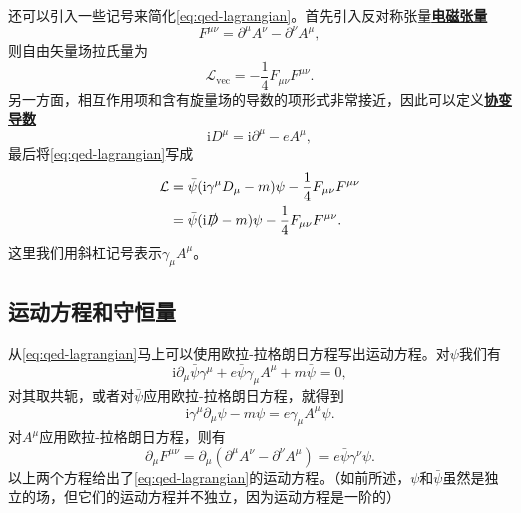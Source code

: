 \documentclass[hyperref, UTF8, a4paper]{ctexart}
\newcommand*{\ii}{\mathrm{i}}
\newcommand{\concept}[1]{\underline{\textbf{#1}}}
\begin{document}
还可以引入一些记号来简化\eqref{eq:qed-lagrangian}。首先引入反对称张量\concept{电磁张量}
\begin{equation}
    F^{\mu \nu} = \partial^\mu A^\nu - \partial^\nu A^\mu,
\end{equation}
则自由矢量场拉氏量为
\[
    \mathcal{L}_\text{vec} = - \frac{1}{4} F_{\mu \nu} F^{\mu \nu}.
\]
另一方面，相互作用项和含有旋量场的导数的项形式非常接近，因此可以定义\concept{协变导数}
\begin{equation}
    \ii D^\mu = \ii \partial^\mu - e A^\mu,
\end{equation}
最后将\eqref{eq:qed-lagrangian}写成
\begin{equation}
    \begin{aligned}
        \mathcal{L} &= \bar{\psi} (\ii \gamma^\mu D_\mu - m) \psi - \frac{1}{4} F_{\mu \nu} F^{\mu \nu} \\
        &= \bar{\psi} (\ii \slashed{D} - m) \psi - \frac{1}{4} F_{\mu \nu} F^{\mu \nu}. 
    \end{aligned}
    \label{eq:short-qed-lagrangian}
\end{equation}
这里我们用斜杠记号表示$\gamma_\mu A^\mu$。

\subsection{运动方程和守恒量}\label{sec:four-eqs}

从\eqref{eq:qed-lagrangian}马上可以使用欧拉-拉格朗日方程写出运动方程。对$\psi$我们有
\[
    \ii \partial_\mu \bar{\psi} \gamma^\mu + e \bar{\psi} \gamma_\mu A^\mu + m \bar{\psi} = 0,
\]
对其取共轭，或者对$\bar{\psi}$应用欧拉-拉格朗日方程，就得到
\begin{equation}
    \ii \gamma^\mu \partial_\mu \psi - m \psi = e \gamma_\mu A^\mu \psi.
    \label{eq:movement-eq-1}
\end{equation}
对$A^\mu$应用欧拉-拉格朗日方程，则有
\begin{equation}
    \partial_\mu F^{\mu \nu} = \partial_\mu (\partial^\mu A^\nu - \partial^\nu A^\mu) = e \bar{\psi} \gamma^\nu \psi.
    \label{eq:movement-eq-2}
\end{equation}
以上两个方程给出了\eqref{eq:qed-lagrangian}的运动方程。（如前所述，$\psi$和$\bar{\psi}$虽然是独立的场，但它们的运动方程并不独立，因为运动方程是一阶的）
\end{document}
